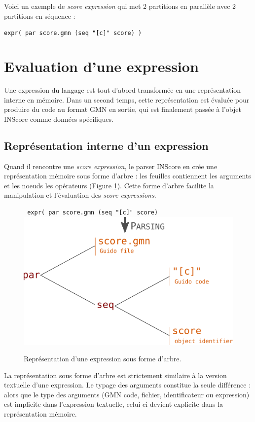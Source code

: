 \documentclass{article}
\newcommand{\OSC}[1]{\texttt{#1}}
\newcommand{\oper}[1]{\textcolor{figRed}{#1}}
\newcommand{\param}[1]{\textcolor{figOrange}{#1}}
\newcommand{\sExpr}{\emph{score expression}}
\newcommand{\sExprs}{\emph{score expressions}}
\newcommand{\sample}	[1]			{\vspace{-0.2em}\begin{center}\colorbox{mygrey}{\begin{minipage}[t]{0.97\columnwidth} {\small \texttt{#1}}\end{minipage}}\end{center}}
\begin{document}
Voici un exemple de \emph{score expression} qui met 2 partitions en parallèle avec 2 partitions en séquence :
\sample{expr( par score.gmn (seq "[c]" score) )}

\section{Evaluation d'une expression}
\label{evaluationSpec}
Une expression du langage est tout d'abord transformée en une représentation interne en mémoire. Dans un second temps, cette représentation est évaluée pour produire du code au format GMN en sortie, qui est finalement passée à l'objet INScore comme données spécifiques.

\subsection{Représentation interne d'un expression}

Quand il rencontre une  \sExpr, le parser INScore en crée une représentation mémoire sous forme d'arbre : les feuilles contiennent les arguments et les noeuds les opérateurs (Figure \ref{fig:parsing}). Cette forme d'arbre facilite la manipulation et l'évaluation des \sExprs.

\begin{figure}[th]
\centering
\OSC{ expr( \oper{par} \param{score.gmn}  (\oper{seq} \param{"[c]" score})}
\includegraphics[width=0.8\columnwidth]{imgs/exprParse}
\caption{Représentation d'une expression sous forme d'arbre.
\label{fig:parsing}}
\end{figure}

La représentation sous forme d'arbre est strictement similaire à la version textuelle d'une expression. Le typage des arguments constitue la seule différence : alors que le type des arguments (GMN code, fichier, identificateur ou expression) est implicite dans l'expression textuelle, celui-ci devient explicite dans la représentation mémoire. 
\end{document}
